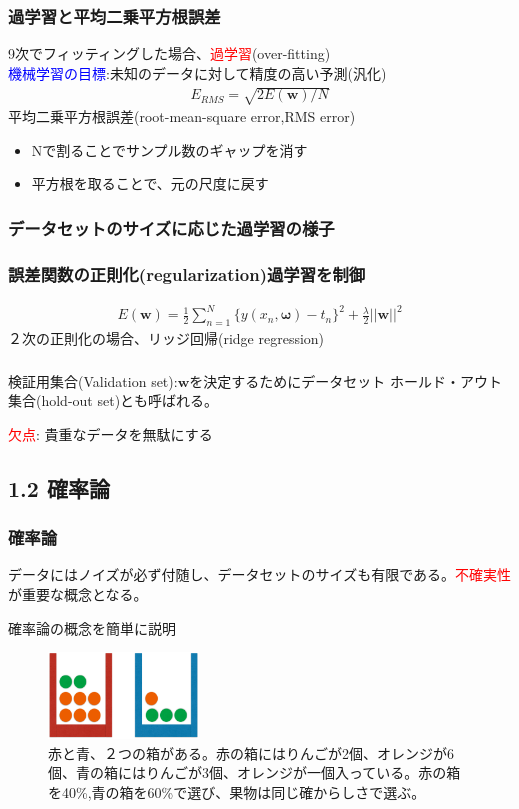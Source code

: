 \documentclass[dvipdfmx]{beamer}
\theoremstyle{definition}
\begin{document}
\begin{frame}
  \frametitle{過学習と平均二乗平方根誤差}
  9次でフィッティングした場合、\textcolor{red}{過学習}(over-fitting)
  \\
  \textcolor{blue}{機械学習の目標}:未知のデータに対して精度の高い予測(汎化)
  \begin{gather*}
    E_{RMS} = \sqrt{2E(\bm{w})/N}
  \end{gather*}
  平均二乗平方根誤差(root-mean-square error,RMS error)
  \\
  \begin{itemize}
    \item Nで割ることでサンプル数のギャップを消す
    \item 平方根を取ることで、元の尺度に戻す
  \end{itemize}
\end{frame}
\begin{frame}
  \frametitle{データセットのサイズに応じた過学習の様子}
\end{frame}
\begin{frame}
  \frametitle{誤差関数の正則化(regularization)過学習を制御}
  \begin{gather*}
    E(\bm{w}) = \frac{1}{2} \sum_{n=1}^{N} \{ y(x_n,\bm{\omega})- t_n \}^2 + \frac{\lambda}{2}||\bm{w} ||^2
  \end{gather*}
  ２次の正則化の場合、リッジ回帰(ridge regression)
\end{frame}

\begin{frame}
  \frametitle{}
  検証用集合(Validation set):$\bm{w}$を決定するためにデータセット ホールド・アウト集合(hold-out set)とも呼ばれる。
  
  \textcolor{red}{欠点}: 貴重なデータを無駄にする
\end{frame}

\subsection{1.2 確率論}

\begin{frame}
  \frametitle{確率論}
  データにはノイズが必ず付随し、データセットのサイズも有限である。\textcolor{red}{不確実性}が重要な概念となる。
  
  \begin{block}{確率論の概念を簡単に説明}
    \begin{figure}[htb]
      \centering
      \includegraphics[width=4.0cm,clip]{res/probability.eps}
      \caption{赤と青、２つの箱がある。赤の箱にはりんごが2個、オレンジが6個、青の箱にはりんごが3個、オレンジが一個入っている。赤の箱を40\%,青の箱を60\%で選び、果物は同じ確からしさで選ぶ。}
    \end{figure}
  \end{block}
\end{frame}
\end{document}
